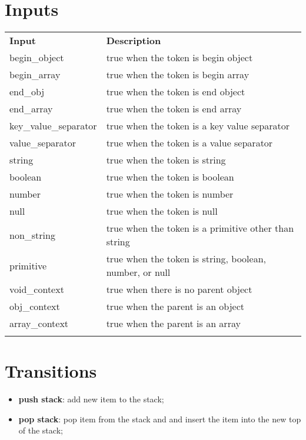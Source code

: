 \documentclass[11pt, letterpaper]{article}
\newcommand{\thickhline}{\specialrule{1pt}{0pt}{0pt}}
\begin{document}
  \section{Inputs}
  
    \begin{tabu} to \linewidth{ X[1,l] | X[3,l] }
      \thickhline
      \textbf{Input} & \textbf{Description} \\ \thickhline 
      begin\_object & true when the token is begin object \\ \hline
      begin\_array & true when the token is begin array \\ \hline
      end\_obj & true when the token is end object \\ \hline
      end\_array & true when the token is end array \\ \hline
      key\_value\_separator & true when the token is a key value separator \\ \hline
      value\_separator & true when the token is a value separator \\ \hline
      string & true when the token is string \\ \hline
      boolean & true when the token is boolean \\ \hline
      number & true when the token is number \\ \hline
      null & true when the token is null \\ \hline
      non\_string & true when the token is a primitive other than string \\ \hline
      primitive & true when the token is string, boolean, number, or null \\ \hline
      void\_context & true when there is no parent object \\ \hline
      obj\_context & true when the parent is an object \\ \hline
      array\_context & true when the parent is an array \\ \thickhline
    \end{tabu}
    
  \section{Transitions}
  
    \begin{itemize}
      \item \textbf{push stack}: add new item to the stack;
      \item \textbf{pop stack}: pop item from the stack and and insert the 
      item into the new top of the stack;
    \end{itemize}
    
\end{document}
